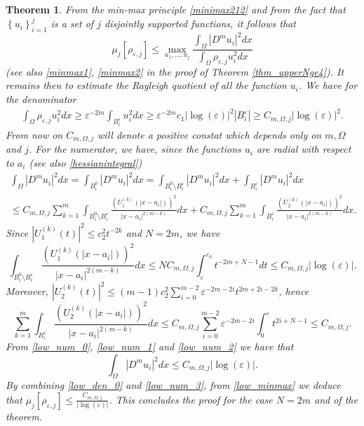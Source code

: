 \documentclass[11pt,a4paper]{amsart}
\numberwithin{equation}{section}
\newtheorem{thm}[equation]{Theorem}
\begin{document}
\begin{thm}
From the min-max principle \eqref{minimax212} and from the fact that $\left\{u_i\right\}_{i=1}^j$ is a set of $j$ disjointly supported functions, it follows that
\begin{equation}\label{low_minmax}
\mu_j[\rho_{\varepsilon,j}]\leq\max_{u_1,...,u_j}\frac{\int_{\Omega}|D^mu_i|^2dx}{\int_{\Omega}\rho_{\varepsilon,j}u_i^2dx}
\end{equation}
(see also \eqref{minmax1}, \eqref{minmax2} in the proof of Theorem \ref{thm_upperNge4}). It remains then to estimate the Rayleigh quotient of all the function $u_i$. We have for the denominator
\begin{multline}\label{low_den_0}
\int_{\Omega}\rho_{\varepsilon,j}u_i^2dx\geq\varepsilon^{-2m}\int_{B_i^{\varepsilon}}u_i^2dx\geq\varepsilon^{-2m}c_1|\log(\varepsilon)|^2|B_i^{\varepsilon}|\geq C_{m,\Omega,j}|\log(\varepsilon)|^2.
\end{multline}
From now on $C_{m,\Omega,j}$ will denote a positive constat which depends only on $m,\Omega$ and $j$. For the numerator, we have, since the functions $u_i$ are radial with respect to $a_i$ (see also \eqref{hessianintegral})
\begin{multline}\label{low_num_0}
\int_{\Omega}|D^m u_i|^2dx=\int_{B_i^0}|D^m u_i|^2dx=\int_{B_i^0\setminus B_i^{\varepsilon}}|D^m u_i|^2dx+\int_{B_i^{\varepsilon}}|D^m u_i|^2dx\\
\leq C_{m,\Omega,j}\sum_{k=1}^m\int_{B_i^0\setminus B_i^{\varepsilon}}\frac{(U_1^{(k)}(|x-a_i|))^2}{|x-a_i|^{2(m-k)}}dx+ C_{m,\Omega,j}\sum_{k=1}^m\int_{B_i^{\varepsilon}}\frac{(U_2^{(k)}(|x-a_i|))^2}{|x-a_i|^{2(m-k)}}dx.
\end{multline}
Since $|U_1^{(k)}(t)|^2\leq c_2^2t^{-2k}$ and $N=2m$, we have
\begin{equation}\label{low_num_1}
\int_{B_i^0\setminus B_i^{\varepsilon}}\frac{(U_1^{(k)}(|x-a_i|))^2}{|x-a_i|^{2(m-k)}}dx\leq N C_{m,\Omega,j}\int_{\varepsilon}^{\varepsilon_0}t^{-2m+N-1}dt\leq C_{m,\Omega,j}|\log(\varepsilon)|.
\end{equation}
Moreover, $|U_2^{(k)}(t)|^2\leq (m-1)c_2^2\sum_{i=0}^{m-2}\varepsilon^{-2m-2i}t^{2m+2i-2k}$, hence
\begin{equation}\label{low_num_2}
\sum_{k=1}^m\int_{B_i^{\varepsilon}}\frac{(U_2^{(k)}(|x-a_i|))^2}{|x-a_i|^{2(m-k)}}dx\leq C_{m,\Omega,j}\sum_{i=0}^{m-2}\varepsilon^{-2m-2i}\int_0^{\varepsilon}t^{2i+N-1}\leq C_{m,\Omega,j}.
\end{equation}
From \eqref{low_num_0}, \eqref{low_num_1} and \eqref{low_num_2} we have that
\begin{equation}\label{low_num_3}
\int_{\Omega}|D^m u_i|^2dx\leq C_{m,\Omega,j}|\log(\varepsilon)|.
\end{equation}
By combining \eqref{low_den_0} and \eqref{low_num_3}, from \eqref{low_minmax} we deduce that $\mu_j[\rho_{\varepsilon,j}]\leq \frac{C_{m,\Omega,j}}{|\log(\varepsilon)|}$. This concludes the proof for the case $N=2m$ and of the theorem.
\endproof
\end{thm}
\end{document}
